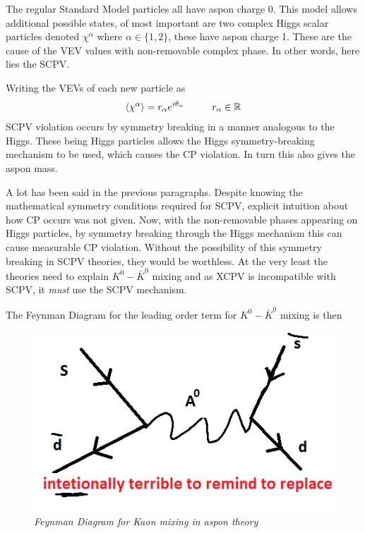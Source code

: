 The regular Standard Model particles all have aspon charge 0. This model allows additional possible states, of most important are two complex Higgs scalar particles denoted $\chi^\alpha$ where $\alpha \in \{1,2\}$, these have aspon charge 1. These are the cause of the VEV values with non-removable complex phase. In other words, here lies the SCPV.

Writing the VEVs of each new particle as
\begin{align*}
\braket{\chi^\alpha}=r_\alpha e^{i \theta_\alpha}\hspace{10mm}r_\alpha \in \mathbb{R}
\end{align*}
SCPV violation occurs by symmetry breaking in a manner analogous to the Higgs. These being Higgs particles allows the Higgs symmetry-breaking mechanism to be used, which causes the CP violation. In turn this also gives the aspon mass.

A lot has been said in the previous paragraphs. Despite knowing the mathematical symmetry conditions required for SCPV, explicit intuition about how CP occurs was not given. Now, with the non-removable phases appearing on Higgs particles, by symmetry breaking through the Higgs mechanism this can cause measurable CP violation. Without the possibility of this symmetry breaking in SCPV theories, they would be worthless. At the very least the theories need to explain $K^0-\bar{K}^0$ mixing and as XCPV is incompatible with SCPV, it \textit{must} use the SCPV mechanism.

The Feynman Diagram for the leading order term for $K^0-\bar{K}^0$ mixing is then
\begin{figure}[h!]
\begin{center}
\includegraphics[scale=0.5]{figs/kill_me.png}
\end{center}
\caption{\textit{Feynman Diagram for Kaon mixing in aspon theory }}
\label{asponkaon}
\end{figure}


